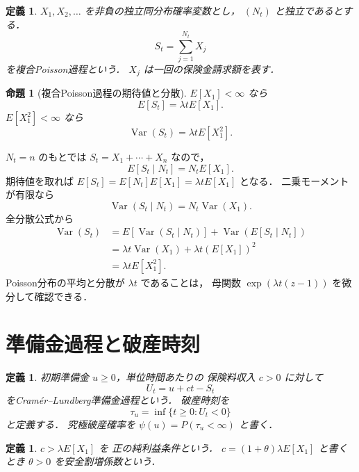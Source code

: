\documentclass[a5paper,10pt,onecolumn]{jsarticle}
\makeatletter
\theoremstyle{mathnotetheorem}
\newtheorem{definition}[theorem]{定義}
\newtheorem{proposition}[theorem]{命題}
\renewcommand{\proofname}{証明}
\renewenvironment{proof}[1][\proofname]{%
  \par\pushQED{\qed}\normalfont\topsep4\p@\@plus2\p@\relax
  \trivlist\item[\hskip\labelsep\bfseries #1]\ignorespaces
}{\popQED\endtrivlist\@endpefalse}
\makeatother
\begin{document}
\begin{definition}
$X_1,X_2,\dots$ を非負の独立同分布確率変数とし，
$(N_t)$ と独立であるとする．
\[
 S_t=\sum_{j=1}^{N_t}X_j
\]
を\emph{複合Poisson過程}という．
$X_j$ は一回の保険金請求額を表す．
\end{definition}

\begin{proposition}[複合Poisson過程の期待値と分散]
\label{prop:compound-moments}
$E[X_1]<\infty$ なら
\[
 E[S_t]=\lambda tE[X_1].
\]
$E[X_1^2]<\infty$ なら
\[
 \operatorname{Var}(S_t)=\lambda tE[X_1^2].
\]
\end{proposition}
\begin{proof}
$N_t=n$ のもとでは
$S_t=X_1+\cdots+X_n$ なので，
\[
 E[S_t\mid N_t]=N_tE[X_1].
\]
期待値を取れば
$E[S_t]=E[N_t]E[X_1]=\lambda tE[X_1]$ となる．
二乗モーメントが有限なら
\[
 \operatorname{Var}(S_t\mid N_t)
 =N_t\operatorname{Var}(X_1).
\]
全分散公式から
\begin{align*}
 \operatorname{Var}(S_t)
 &=E[\operatorname{Var}(S_t\mid N_t)]
 +\operatorname{Var}(E[S_t\mid N_t])\\
 &=\lambda t\operatorname{Var}(X_1)
 +\lambda t(E[X_1])^2\\
 &=\lambda tE[X_1^2].
\end{align*}
Poisson分布の平均と分散が $\lambda t$ であることは，
母関数 $\exp(\lambda t(z-1))$ を微分して確認できる．
\end{proof}

\section{準備金過程と破産時刻}

\begin{definition}
初期準備金 $u\ge0$，単位時間あたりの
保険料収入 $c>0$ に対して
\[
 U_t=u+ct-S_t
\]
を\emph{Cram\'er--Lundberg準備金過程}という．
\emph{破産時刻}を
\[
 \tau_u=\inf\{t\ge0:U_t<0\}
\]
と定義する．
\emph{究極破産確率}を
$\psi(u)=P(\tau_u<\infty)$ と書く．
\end{definition}

\begin{definition}
$c>\lambda E[X_1]$ を
\emph{正の純利益条件}という．
$c=(1+\theta)\lambda E[X_1]$ と書くとき
$\theta>0$ を安全割増係数という．
\end{definition}
\end{document}
